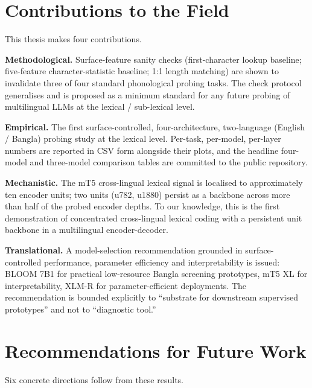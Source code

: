 \section{Contributions to the Field}

This thesis makes four contributions.

\textbf{Methodological.} Surface-feature sanity checks (first-character lookup baseline; five-feature character-statistic baseline; 1:1 length matching) are shown to invalidate three of four standard phonological probing tasks. The check protocol generalises and is proposed as a minimum standard for any future probing of multilingual LLMs at the lexical / sub-lexical level.

\textbf{Empirical.} The first surface-controlled, four-architecture, two-language (English / Bangla) probing study at the lexical level. Per-task, per-model, per-layer numbers are reported in CSV form alongside their plots, and the headline four-model and three-model comparison tables are committed to the public repository.

\textbf{Mechanistic.} The mT5 cross-lingual lexical signal is localised to approximately ten encoder units; two units (u782, u1880) persist as a backbone across more than half of the probed encoder depths. To our knowledge, this is the first demonstration of concentrated cross-lingual lexical coding with a persistent unit backbone in a multilingual encoder-decoder.

\textbf{Translational.} A model-selection recommendation grounded in surface-controlled performance, parameter efficiency and interpretability is issued: BLOOM 7B1 for practical low-resource Bangla screening prototypes, mT5 XL for interpretability, XLM-R for parameter-efficient deployments. The recommendation is bounded explicitly to ``substrate for downstream supervised prototypes'' and not to ``diagnostic tool.''

\section{Recommendations for Future Work}

Six concrete directions follow from these results.

